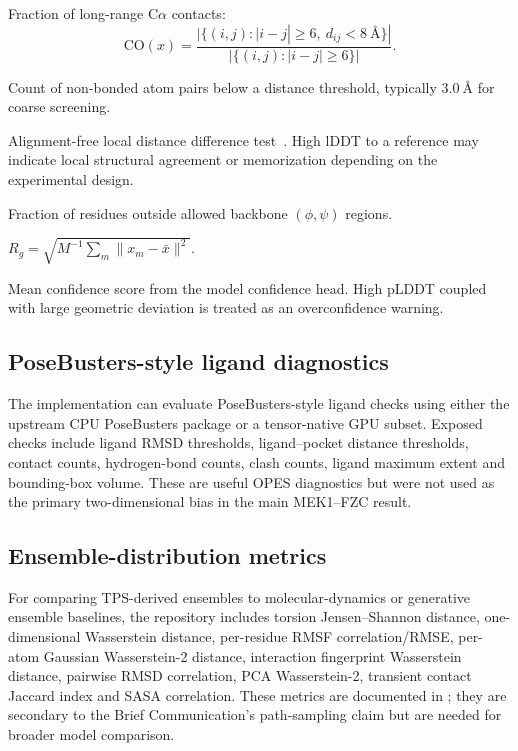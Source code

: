 \documentclass[11pt,a4paper]{article}
\begin{document}
\begin{description}[leftmargin=!,labelwidth=1.55in]
  \item[Contact order]
  Fraction of long-range C$\alpha$ contacts:
  \[
    \mathrm{CO}(x)=
    \frac{|\{(i,j): |i-j|\ge 6,\ d_{ij}<8~\text{\AA}\}|}
    {|\{(i,j): |i-j|\ge 6\}|}.
  \]
  \item[Steric clashes]
  Count of non-bonded atom pairs below a distance threshold, typically
  $3.0~\text{\AA}$ for coarse screening.
  \item[lDDT]
  Alignment-free local distance difference test~\cite{mariani2013lddt}.
  High lDDT to a reference may indicate local structural agreement or
  memorization depending on the experimental design.
  \item[Ramachandran outliers]
  Fraction of residues outside allowed backbone $(\phi,\psi)$ regions.
  \item[Radius of gyration]
  $R_g=\sqrt{M^{-1}\sum_m\|x_m-\bar x\|^2}$.
  \item[Boltz pLDDT]
  Mean confidence score from the model confidence head. High pLDDT coupled
  with large geometric deviation is treated as an overconfidence warning.
\end{description}

\subsection{PoseBusters-style ligand diagnostics}

The implementation can evaluate PoseBusters-style ligand checks using either
the upstream CPU PoseBusters package or a tensor-native GPU subset. Exposed
checks include ligand RMSD thresholds, ligand--pocket distance thresholds,
contact counts, hydrogen-bond counts, clash counts, ligand maximum extent and
bounding-box volume. These are useful OPES diagnostics but were not used as
the primary two-dimensional bias in the main MEK1--FZC result.

\subsection{Ensemble-distribution metrics}

For comparing TPS-derived ensembles to molecular-dynamics or generative
ensemble baselines, the repository includes torsion Jensen--Shannon distance,
one-dimensional Wasserstein distance, per-residue RMSF correlation/RMSE,
per-atom Gaussian Wasserstein-2 distance, interaction fingerprint
Wasserstein distance, pairwise RMSD correlation, PCA Wasserstein-2,
transient contact Jaccard index and SASA correlation. These
metrics are documented in ; they are
secondary to the Brief Communication's path-sampling claim but are needed for
broader model comparison.
\end{document}
